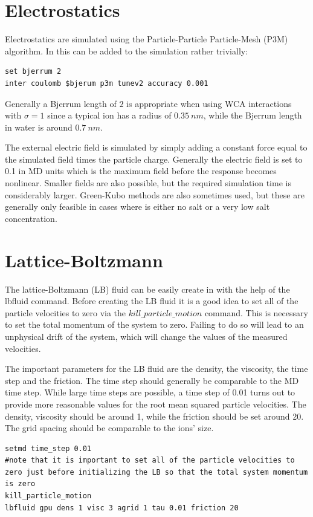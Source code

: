 \documentclass[
paper=a4,                       %
fontsize=11pt,                  %
twoside,                        %
footsepline,                    %
headsepline,                    %
headinclude=false,              %
footinclude=false,              %
pagesize,                       %
]{scrartcl}
\begin{document}
\section{Electrostatics}
Electrostatics are simulated using the Particle-Particle Particle-Mesh (P3M) algorithm. In \es{} this can be added to the simulation rather trivially:
{\small\vspace{0,2cm}
\begin{lstlisting}[numbers=none]
set bjerrum 2
inter coulomb $bjerum p3m tunev2 accuracy 0.001
\end{lstlisting}
Generally a Bjerrum length of $2$ is appropriate when using WCA interactions with $\sigma=1$ since a typical ion has a radius of $\SI{0.35}{nm}$, while the Bjerrum
length in water is around $\SI{0.7}{nm}$.

The external electric field is simulated by simply adding a constant force equal to the simulated field times the particle charge. Generally the electric field is set to 0.1 in MD units
which is the maximum field before the response becomes nonlinear. Smaller fields are also possible, but the required simulation time is considerably larger. Green-Kubo methods
are also sometimes used, but these are generally only feasible in cases where is either no salt or a very low salt concentration.

\section{Lattice-Boltzmann}
The lattice-Boltzmann (LB) fluid can be easily create in \es{} with the help of the lbfluid command.
Before creating the LB fluid it is a good idea to set all of the particle velocities to zero via the $kill\_particle\_motion$ command.
This is necessary to set the total momentum of the system to zero. Failing to do so will lead to an unphysical drift of the system, which
will change the values of the measured velocities.

The important parameters for the LB fluid are the density, the viscosity, the time step and the friction. The time step should generally be comparable to the MD time step. While
large time steps are possible, a time step of 0.01 turns out to provide more reasonable values for the root mean squared particle velocities. The density, viscosity
should be around 1, while the friction should be set around 20. The grid spacing should be comparable to the ions' size.
{\small\vspace{0,2cm}
\begin{lstlisting}[numbers=none]
setmd time_step 0.01
#note that it is important to set all of the particle velocities to zero just before initializing the LB so that the total system momentum is zero
kill_particle_motion
lbfluid gpu dens 1 visc 3 agrid 1 tau 0.01 friction 20


\end{lstlisting}}}
\end{document}
